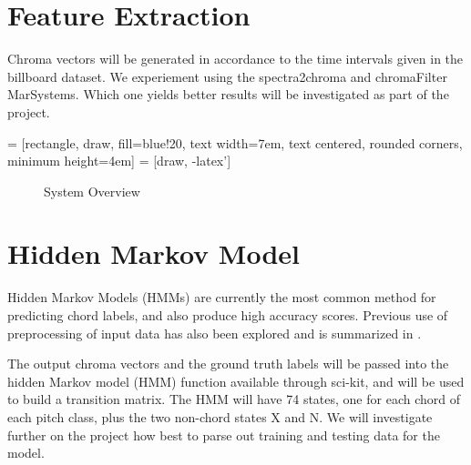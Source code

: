 \documentclass{article}
\begin{document}
\section{Feature Extraction}

Chroma vectors will be generated in accordance to the time intervals given in
the billboard dataset.  We experiement using the spectra2chroma and chromaFilter
MarSystems. Which one yields better results will be investigated as part of the
project.

 = [rectangle, draw, fill=blue!20,
    text width=7em, text centered, rounded corners, minimum height=4em]
 = [draw, -latex']

\begin{figure}
\caption{System Overview}
\end{figure}

\section{Hidden Markov Model}

Hidden Markov Models (HMMs) are currently the most common method for predicting
chord labels, and also produce high accuracy scores. Previous use of
preprocessing of input data has also been explored and is summarized in
\cite{McVicar:00}.

The output chroma vectors and the ground truth labels will be passed into the
hidden Markov model (HMM) function available through sci-kit, and will be used
to build a transition matrix. The HMM will have 74 states, one for each chord
of each pitch class, plus the two non-chord states X and N. We will investigate
further on the project how best to parse out training and testing data for the
model.
\end{document}
